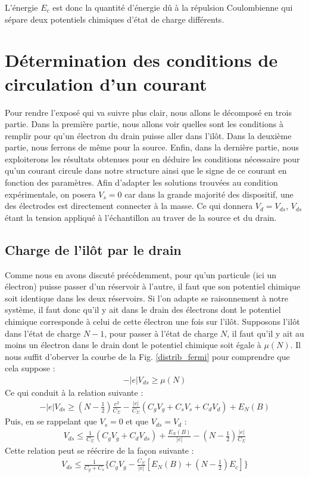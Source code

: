 L'énergie $E_c$ est donc la quantité d'énergie d\^u à la répulsion Coulombienne qui sépare deux potentiels chimiques d'état de charge différents.


\section{Détermination des conditions de circulation d'un courant}
Pour rendre l'exposé qui va suivre plus clair, nous allons le décomposé en trois partie. Dans la première partie, nous allons voir quelles sont les conditions à remplir pour qu'un électron du drain puisse aller dans l'il\^ot. Dans la deuxième partie, nous ferrons de m\^eme pour la source. Enfin, dans la dernière partie, nous exploiterons les résultats obtenues pour en déduire les conditions nécessaire pour qu'un courant circule dans notre structure ainsi que le signe de ce courant en fonction des paramètres. Afin d'adapter les solutions trouvées au condition expérimentale, on posera $V_s = 0$ car dans la grande majorité des dispositif, une des électrodes est directement connecter à la masse. Ce qui donnera $V_d=V_{ds}$, $V_{ds}$ étant la tension appliqué à l'échantillon au traver de la source et du drain.

\subsection{Charge de l'il\^ot par le drain}
Comme nous en avons discuté précédemment, pour qu'un particule (ici un électron) puisse passer d'un réservoir à l'autre, il faut que son potentiel chimique soit identique dans les deux réservoirs. Si l'on adapte se raisonnement à notre système, il faut donc qu'il y ait dans le drain des électrons dont le potentiel chimique corresponde à celui de cette électron une fois sur l'il\^ot. Supposons l'il\^ot dans l'état de charge $N-1$, pour passer à l'état de charge $N$, il faut qu'il y ait au moins un électron dans le drain dont le potentiel chimique soit égale à $\mu(N)$. Il nous suffit d'oberver la courbe de la Fig. \ref{distrib_fermi} pour comprendre que cela suppose :
\begin{eqnarray}
-|e|V_{ds} \geq \mu(N) \nonumber
\end{eqnarray}
Ce qui conduit à la relation suivante :
\begin{eqnarray}
-|e|V_{ds} \geq (N-\frac{1}{2})\frac{e^2}{C_{\Sigma}}
-
\frac{|e|}{C_{\Sigma}}(C_gV_g + C_sV_s + C_dV_d)
+
E_N(B) \nonumber
\end{eqnarray}
Puis, en se rappelant que $V_s= 0$ et que $V_{ds} = V_d$ :
\begin{eqnarray}
V_{ds} \leq \frac{1}{C_{\Sigma}}(C_gV_g + C_dV_{ds}) + \frac{E_N(B)}{|e|} - (N-\frac{1}{2})\frac{|e|}{C_{\Sigma}} \nonumber
\end{eqnarray}
Cette relation peut se réécrire de la façon suivante :
\begin{eqnarray}
V_{ds} \leq \frac{1}{C_g + C_s} \{C_gV_g - \frac{C_{\Sigma}}{|e|}[E_N(B) + (N-\frac{1}{2})E_c] \}
\end{eqnarray}

